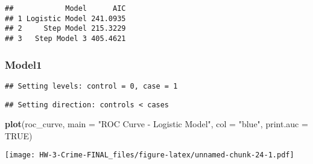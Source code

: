 \documentclass[
]{article}
\newenvironment{Shaded}{\begin{snugshade}}{\end{snugshade}}
\newcommand{\AttributeTok}[1]{\textcolor[rgb]{0.13,0.29,0.53}{#1}}
\newcommand{\ConstantTok}[1]{\textcolor[rgb]{0.56,0.35,0.01}{#1}}
\newcommand{\FunctionTok}[1]{\textcolor[rgb]{0.13,0.29,0.53}{\textbf{#1}}}
\newcommand{\NormalTok}[1]{#1}
\newcommand{\OtherTok}[1]{\textcolor[rgb]{0.56,0.35,0.01}{#1}}
\newcommand{\SpecialCharTok}[1]{\textcolor[rgb]{0.81,0.36,0.00}{\textbf{#1}}}
\newcommand{\StringTok}[1]{\textcolor[rgb]{0.31,0.60,0.02}{#1}}
\begin{document}
\begin{verbatim}
##            Model      AIC
## 1 Logistic Model 241.0935
## 2     Step Model 215.3229
## 3   Step Model 3 405.4621
\end{verbatim}

\hypertarget{model1}{%
\subsubsection{Model1}\label{model1}}

\begin{Shaded}
\end{Shaded}

\begin{verbatim}
## Setting levels: control = 0, case = 1
\end{verbatim}

\begin{verbatim}
## Setting direction: controls < cases
\end{verbatim}

\begin{Shaded}
\begin{Highlighting}[]
\FunctionTok{plot}\NormalTok{(roc\_curve, }\AttributeTok{main =} \StringTok{"ROC Curve {-} Logistic Model"}\NormalTok{, }\AttributeTok{col =} \StringTok{"blue"}\NormalTok{, }\AttributeTok{print.auc =} \ConstantTok{TRUE}\NormalTok{) }
\end{Highlighting}
\end{Shaded}

\texttt{[image: HW-3-Crime-FINAL\_files/figure-latex/unnamed-chunk-24-1.pdf]}
\end{document}
